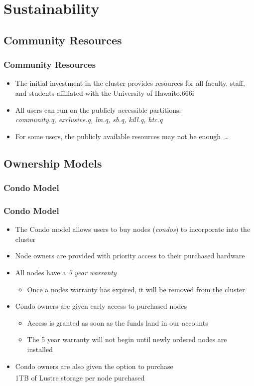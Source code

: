 \documentclass[t,hyperref={pdfpagelabels=false}]{beamer}
\newlength{\okinalen}
\newcommand{\okina}{\hbox to.666\okinalen{\hss`\hss}}
\newcommand{\regtrademark}{\fontsize{5}{6}\selectfont \textsuperscript{\textregistered}}
\newcommand{\hawaii}{Hawai{\okina}i}
\newcommand{\lustre}{Lustre{\regtrademark}}
\begin{document}
\section{Sustainability}
\subsection{Community Resources}
\begin{frame}
	\frametitle{Community Resources}
	\begin{itemize}
		\item The initial investment in the cluster provides resources for all faculty, staff, and students affiliated with the University of {\hawaii}
		\item All users can run on the publicly accessible partitions:\\ \emph{community.q, exclusive.q, lm.q, sb.q, kill.q, htc.q}
		\item For some users, the publicly available resources may not be enough~\ldots
	\end{itemize}
\end{frame}

\subsection{Ownership Models}

\subsubsection{Condo Model}
\begin{frame}
	\frametitle{Condo Model}
	\begin{itemize}
		\item The Condo model allows users to buy nodes (\emph{condos}) to incorporate into the cluster	
		\item Node owners are provided with priority access to their purchased hardware
		\item All nodes have a \emph{5 year warranty}
		\begin{itemize}
			\item Once a nodes warranty has expired, it will be removed from the cluster
		\end{itemize}
		\item Condo owners are given early access to purchased nodes
		  \begin{itemize}
                    \item Access is granted as soon as the funds land in our accounts
		    \item The 5 year warranty will not begin until newly ordered nodes are installed
		\end{itemize}
		\item Condo owners are also given the option to purchase~\\1TB of {\lustre} storage per node purchased
	\end{itemize}
\end{frame}
\end{document}
